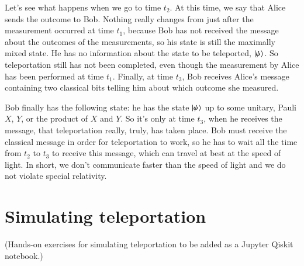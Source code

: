 Let's see what happens when we go to time $t_2$. At this time, we say that Alice sends the outcome to Bob. Nothing really changes from just after the measurement occurred at time $t_1$, because Bob has not received the message about the outcomes of the measurements, so his state is still the maximally mixed state. He has no information about the state to be teleported, $\left| \psi \right\rangle$. So teleportation still has not been completed, even though the measurement by Alice has been performed at time $t_1$. Finally, at time $t_3$, Bob receives Alice's message containing two classical bits telling him about which outcome she measured.

Bob finally has the following state: he has the state $\left| \psi \right\rangle$ up to some unitary, Pauli $X$, $Y$, or the product of $X$ and $Y$. So it's only at time $t_3$, when he receives the message, that teleportation really, truly, has taken place. Bob must receive the classical message in order for teleportation to work, so he has to wait all the time from $t_2$ to $t_3$ to receive this message, which can travel at best at the speed of light. In short, we don't communicate faster than the speed of light and we do not violate special relativity.


\section{Simulating teleportation}
\label{sec:8-4_simulating}

(Hands-on exercises for simulating teleportation to be added as a Jupyter Qiskit notebook.)


\newpage
\begin{exercises}


\end{exercises}


